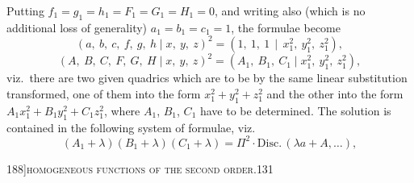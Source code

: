 \documentclass[11pt]{article}
\begin{document}
Putting $f_{1} = g_{1} = h_{1} = F_{1} = G_{1} = H_{1} = 0$, and writing also (which is no additional loss of generality) $a_{1} = b_{1} = c_{1} = 1$, the formulae become
\[
(a,\ b,\ c,\ f,\ g,\ h \mid x,\ y,\ z)^{2} = (1,\ 1,\ 1\,\mid\, x_{1}^{2},\ y_{1}^{2},\ z_{1}^{2}),
\]
\[
(A,\ B,\ C,\ F,\ G,\ H \mid x,\ y,\ z)^{2} = (A_{1},\ B_{1},\ C_{1}\mid x_{1}^{2},\ y_{1}^{2},\ z_{1}^{2}),
\]
viz.\ there are two given quadrics which are to be by the same linear substitution transformed, one of them into the form $x_{1}^{2} + y_{1}^{2} + z_{1}^{2}$ and the other into the form $A_{1} x_{1}^{2} + B_{1} y_{1}^{2} + C_{1} z_{1}^{2}$, where $A_{1}$, $B_{1}$, $C_{1}$ have to be determined. The solution is contained in the following system of formulae, viz.
\[
(A_{1} + \lambda)(B_{1} + \lambda)(C_{1} + \lambda) = \Pi^{2}\cdot\mathrm{Disc.}\,(\lambda a + A,\ldots),
\]

\newpage

\begin{center}
\small 188]\hfill\textsc{homogeneous functions of the second order.}\hfill\textsc{131}
\end{center}

\medskip
\end{document}
